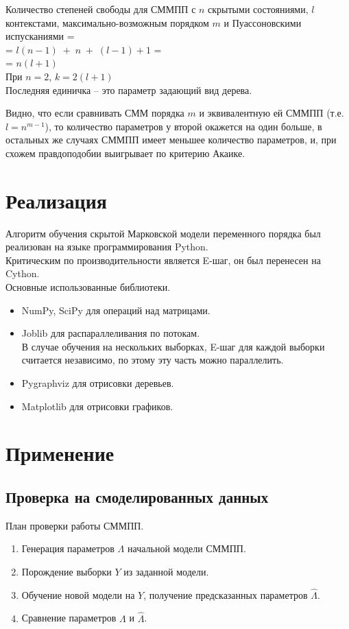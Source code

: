 \documentclass{matmex-diploma-custom}
\begin{document}
Количество степеней свободы для СММПП с $n$ скрытыми состояниями, $l$ контекстами, максимально-возможным порядком $m$ и Пуассоновскими испусканиями =
\\= $l(n-1)\;+\;n\;+\;(l-1) + 1$ = 
\\= $n(l+1)$
\\
При $n=2$, $k=2(l+1)$ 
\\
Последняя единичка -- это параметр задающий вид дерева.

Видно, что если сравнивать СММ порядка $m$ и эквивалентную ей СММПП (т.е. $l = n^{m-1}$), то количество параметров у второй окажется на один больше, в остальных же случаях СММПП имеет меньшее количество параметров, и, при схожем правдоподобии выигрывает по критерию Акаике.


\section{Реализация}
Алгоритм обучения скрытой Марковской модели переменного порядка был реализован на языке программирования Python. 
\\
Критическим по производительности является E-шаг, он был перенесен на Cython.
\\
Основные использованные библиотеки.
\begin{itemize}
\item
NumPy, SciPy для операций над матрицами.
\item
Joblib для распараллеливания по потокам.
\\
В случае обучения на нескольких выборках, E-шаг для каждой выборки считается независимо, по этому эту часть можно параллелить.
\item
Pygraphviz для отрисовки деревьев. 
\item
Matplotlib для отрисовки графиков.
\end{itemize}

\section{Применение}
\subsection{Проверка на смоделированных данных}
План проверки работы СММПП.
\begin{enumerate}

\item
Генерация параметров $ \Lambda $ начальной модели СММПП.
\item
Порождение выборки $ Y $ из заданной модели.
\item
Обучение новой модели на $ Y $, получение предсказанных параметров $\hat{\Lambda}$.
\item
Сравнение параметров $ \Lambda $ и $ \hat{\Lambda} $.
\end{enumerate}
\end{document}
